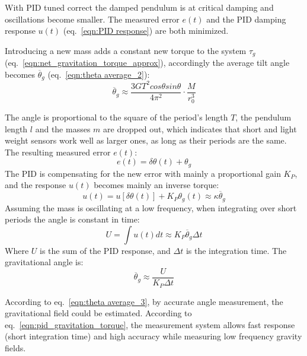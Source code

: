 \documentclass[\main/master.tex]{subfiles}
\begin{document}
\par\noindent
With PID tuned correct the damped pendulum is at critical damping and oscillations become smaller. The measured error $e(t)$ and the PID damping response $u(t)$ (eq.~\ref{eqn:PID response}) are both minimized. 
\par\noindent
Introducing a new mass adds a constant new torque to the system $\tau_g$ (eq.~\ref{eqn:net_gravitation_torque_approx}), accordingly the average tilt angle becomes $\overline{\theta}_g$ (eq.~\ref{eqn:theta average_2}):
\begin{equation}
\overline{\theta}_g  \approx \frac{3GT^2cos\theta sin\theta}{4\pi^2 } \cdot \frac{M}{r_0^3}   \label{eqn:theta average_3}
\end{equation}
\par\noindent
The angle is proportional to the square of the period's length $T$, the pendulum length $l$ and the masses $m$ are dropped out, which indicates that short and light weight sensors work well as larger ones, as long as their periods are the same. The resulting measured error $e(t)$:
\begin{equation}
e(t) = \delta\theta(t) + \theta_g    \label{eqn:error_measurement}
\end{equation}
The PID is compensating for the new error with mainly a proportional gain $K_P$, and the response $u(t)$ becomes mainly an inverse torque:
\begin{equation}
u(t) = u[ \delta\theta(t)] + K_P\theta_g(t) \approx \kappa \overline{\theta}_g \label{eqn:PID_response}
\end{equation}
Assuming the mass is oscillating at a low frequency, when integrating over short periods the angle is constant in time:
\begin{equation}
U = \int u(t) dt  \approx K_P\overline{\theta}_g\Delta t  \label{eqn:PID_measurement_eqn}
\end{equation}
Where $U$ is the sum of the PID response, and $\Delta t$ is the integration time. The gravitational angle is:
\begin{equation}
\overline{\theta}_g \approx \frac{U}{K_P\Delta t}      \label{eqn:pid_gravitation_torque}
\end{equation}
\par\noindent
According to eq.~\ref{eqn:theta average_3}, by accurate angle measurement, the gravitational field could be estimated. According to eq.~\ref{eqn:pid_gravitation_torque}, the measurement system allows fast response (short integration time) and high accuracy while measuring low frequency gravity fields. 

 
 
 
 
\end{document}

